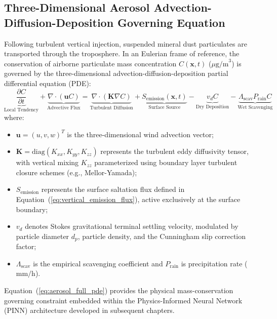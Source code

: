 \subsection{Three-Dimensional Aerosol Advection-Diffusion-Deposition Governing Equation}
\label{subsec:aerosol_pde}

Following turbulent vertical injection, suspended mineral dust particulates are transported through the troposphere. In an Eulerian frame of reference, the conservation of airborne particulate mass concentration $C(\mathbf{x}, t)$ ($\mu\text{g/m}^3$) is governed by the three-dimensional advection-diffusion-deposition partial differential equation (PDE):
\begin{equation}
\label{eq:aerosol_full_pde}
\underbrace{\frac{\partial C}{\partial t}}_{\text{Local Tendency}} + \underbrace{\nabla \cdot (\mathbf{u} C)}_{\text{Advective Flux}} = \underbrace{\nabla \cdot (\mathbf{K} \nabla C)}_{\text{Turbulent Diffusion}} + \underbrace{S_{\text{emission}}(\mathbf{x}, t)}_{\text{Surface Source}} - \underbrace{v_d C}_{\text{Dry Deposition}} - \underbrace{\Lambda_{\text{scav}} P_{\text{rain}} C}_{\text{Wet Scavenging}}
\end{equation}
where:
\begin{itemize}
    \item $\mathbf{u} = (u, v, w)^T$ is the three-dimensional wind advection vector;
    \item $\mathbf{K} = \text{diag}(K_{xx}, K_{yy}, K_{zz})$ represents the turbulent eddy diffusivity tensor, with vertical mixing $K_{zz}$ parameterized using boundary layer turbulent closure schemes (e.g., Mellor-Yamada);
    \item $S_{\text{emission}}$ represents the surface saltation flux defined in Equation~(\ref{eq:vertical_emission_flux}), active exclusively at the surface boundary;
    \item $v_d$ denotes Stokes gravitational terminal settling velocity, modulated by particle diameter $d_p$, particle density, and the Cunningham slip correction factor;
    \item $\Lambda_{\text{scav}}$ is the empirical scavenging coefficient and $P_{\text{rain}}$ is precipitation rate ($\text{mm/h}$).
\end{itemize}

Equation~(\ref{eq:aerosol_full_pde}) provides the physical mass-conservation governing constraint embedded within the Physics-Informed Neural Network (PINN) architecture developed in subsequent chapters.

